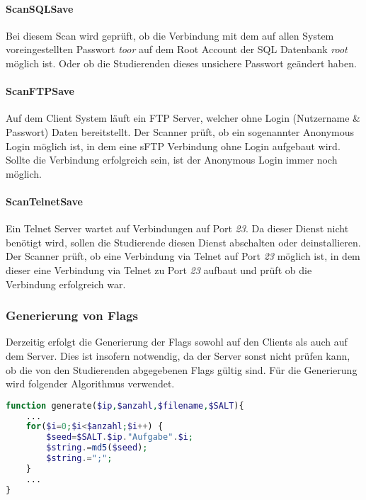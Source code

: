 \paragraph{ScanSQLSave}\label{para:ScanSQLSave}
Bei diesem Scan wird geprüft, ob die Verbindung mit dem auf allen System voreingestellten Passwort \textit{toor} auf dem Root Account der SQL Datenbank \textit{root} möglich ist. Oder ob die Studierenden dieses unsichere Passwort geändert haben.

\paragraph{ScanFTPSave}\label{para:ScanFTPSave}
Auf dem Client System läuft ein FTP Server, welcher ohne Login (Nutzername \& Passwort) Daten bereitstellt. Der Scanner prüft, ob ein sogenannter Anonymous Login möglich ist, in dem eine sFTP Verbindung ohne Login aufgebaut wird. Sollte die Verbindung erfolgreich sein, ist der Anonymous Login immer noch möglich.

\paragraph{ScanTelnetSave}\label{para:ScanTelnetSave}
Ein Telnet Server wartet auf Verbindungen auf Port \textit{23}. Da dieser Dienst nicht benötigt wird, sollen die Studierende diesen Dienst abschalten oder deinstallieren. Der Scanner prüft, ob eine Verbindung via Telnet auf Port \textit{23} möglich ist, in dem dieser eine Verbindung via Telnet zu Port \textit{23} aufbaut und prüft ob die Verbindung erfolgreich war.

\subsubsection{Generierung von Flags}\label{subsubsec:Generierung_von_Flags}

Derzeitig erfolgt die Generierung der Flags sowohl auf den Clients als auch auf dem Server. Dies ist insofern notwendig, da der Server sonst nicht prüfen kann, ob die von den Studierenden abgegebenen Flags gültig sind. Für die Generierung wird folgender Algorithmus verwendet.

\begin{lstlisting}[language=PHP,caption={Algorithmus zur Generiung der Flags},captionpos=b]
function generate($ip,$anzahl,$filename,$SALT){
	...
	for($i=0;$i<$anzahl;$i++) {
		$seed=$SALT.$ip."Aufgabe".$i;	
		$string.=md5($seed);
		$string.=";";
	}
	...
}
\end{lstlisting}

